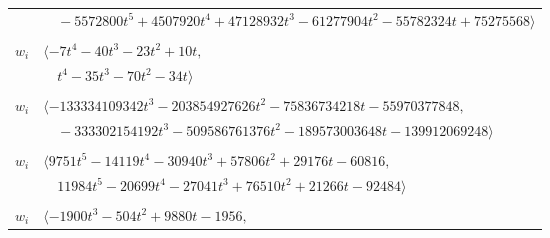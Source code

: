 \documentclass[11pt]{article}
\begin{document}
\begin{longtable}{@{}ll@{}}
 & $\quad -5572800t^{5}+4507920t^{4}+47128932t^{3}-61277904t^{2}-55782324t+75275568\rangle$\\
\addlinespace[2pt]
\multicolumn{2}{@{}p{0.97\textwidth}@{}}{$i=54$, $D_i=1$, $\rho_{ij}$: $2{:}2, \allowbreak 3{:}1, \allowbreak 5{:}1, \allowbreak 7{:}1, \allowbreak 28{:}1, \allowbreak 49{:}2$}\\
$w_i$ & $\langle -7t^{4}-40t^{3}-23t^{2}+10t,$\\
 & $\quad t^{4}-35t^{3}-70t^{2}-34t\rangle$\\
\addlinespace[2pt]
\multicolumn{2}{@{}p{0.97\textwidth}@{}}{$i=55$, $D_i=1$, $\rho_{ij}$: $6{:}2, \allowbreak 9{:}2, \allowbreak 15{:}1, \allowbreak 22{:}1, \allowbreak 25{:}2, \allowbreak 26{:}1, \allowbreak 27{:}2, \allowbreak 30{:}1, \allowbreak 31{:}2, \allowbreak 33{:}2, \allowbreak 34{:}1, \allowbreak 41{:}2, \allowbreak 42{:}1, \allowbreak 44{:}1, \allowbreak 57{:}2, \allowbreak 65{:}1, \allowbreak 68{:}1, \allowbreak 73{:}2, \allowbreak 76{:}2, \allowbreak 79{:}1, \allowbreak 86{:}2, \allowbreak 93{:}1$}\\
$w_i$ & $\langle -133334109342t^{3}-203854927626t^{2}-75836734218t-55970377848,$\\
 & $\quad -333302154192t^{3}-509586761376t^{2}-189573003648t-139912069248\rangle$\\
\addlinespace[2pt]
\multicolumn{2}{@{}p{0.97\textwidth}@{}}{$i=56$, $D_i=1$, $\rho_{ij}$: $12{:}2, \allowbreak 16{:}2, \allowbreak 17{:}1, \allowbreak 23{:}1, \allowbreak 24{:}2, \allowbreak 29{:}2, \allowbreak 30{:}2, \allowbreak 31{:}1, \allowbreak 33{:}2, \allowbreak 34{:}1, \allowbreak 35{:}1, \allowbreak 39{:}2, \allowbreak 40{:}1, \allowbreak 46{:}2, \allowbreak 47{:}2, \allowbreak 48{:}1, \allowbreak 70{:}1, \allowbreak 77{:}2, \allowbreak 78{:}1, \allowbreak 81{:}1, \allowbreak 83{:}2, \allowbreak 88{:}1, \allowbreak 89{:}1, \allowbreak 90{:}2$}\\
$w_i$ & $\langle 9751t^{5}-14119t^{4}-30940t^{3}+57806t^{2}+29176t-60816,$\\
 & $\quad 11984t^{5}-20699t^{4}-27041t^{3}+76510t^{2}+21266t-92484\rangle$\\
\addlinespace[2pt]
\multicolumn{2}{@{}p{0.97\textwidth}@{}}{$i=57$, $D_i=1$, $\rho_{ij}$: $1{:}1, \allowbreak 3{:}2, \allowbreak 6{:}2, \allowbreak 9{:}1, \allowbreak 22{:}2, \allowbreak 25{:}2, \allowbreak 26{:}2, \allowbreak 36{:}1, \allowbreak 39{:}2, \allowbreak 51{:}2, \allowbreak 53{:}2, \allowbreak 55{:}1, \allowbreak 60{:}1$}\\
$w_i$ & $\langle -1900t^{3}-504t^{2}+9880t-1956,$\\

\end{longtable}
\end{document}
